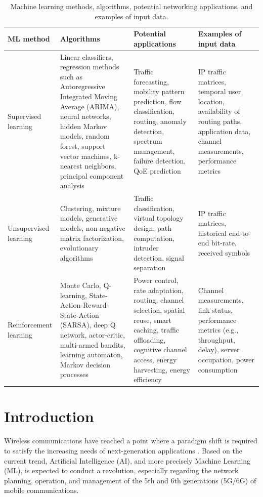 \documentclass[journal]{IEEEtran}
\begin{document}
\begin{table}[t!]
	\caption{Machine learning methods, algorithms, potential networking applications, and examples of input data.}
	\label{table:ml_taxonomy}
	\centering
	\begin{tabular}{|p{}|p{}|p{}|p{}|}
		\hline
		\textbf{ML method} & \textbf{Algorithms} & \textbf{Potential applications} & \textbf{Examples of input data} \\\hline
		Supervised learning & Linear classifiers, regression methods such as Autoregressive Integrated Moving Average (ARIMA), neural networks, hidden Markov models, random forest, support vector machines, k-nearest neighbors, principal component analysis &Traffic forecasting, mobility pattern prediction, flow classification, routing, anomaly detection, spectrum management, failure detection, QoE prediction & IP traffic matrices, temporal user location, availability of routing paths, application data, channel measurements, performance metrics \\\hline
		Unsupervised learning & Clustering, mixture models, generative models, non-negative matrix factorization, evolutionary algorithms & Traffic classification, virtual topology design, path computation, intruder detection, signal separation& IP traffic matrices, historical end-to-end bit-rate, received symbols \\\hline
		Reinforcement learning & Monte Carlo, Q-learning, State-Action-Reward-State-Action (SARSA), deep Q network, actor-critic, multi-armed bandits, learning automaton, Markov decision processes & Power control, rate adaptation, routing, channel selection, spatial reuse, smart caching, traffic offloading, cognitive channel access, energy harvesting, energy efficiency & Channel measurements, link status, performance metrics (e.g., throughput, delay), server occupation, power consumption \\\hline
	\end{tabular}
\end{table}

\section{Introduction}
% 
% 
% 
% 
Wireless communications have reached a point where a paradigm shift is required to satisfy the increasing needs of next-generation applications \cite{osseiran2014scenarios}. Based on the current trend, Artificial Intelligence (AI), and more precisely Machine Learning (ML), is expected to conduct a revolution, especially regarding the network planning, operation, and management of the 5th and 6th generations (5G/6G) of mobile communications. 
\end{document}
